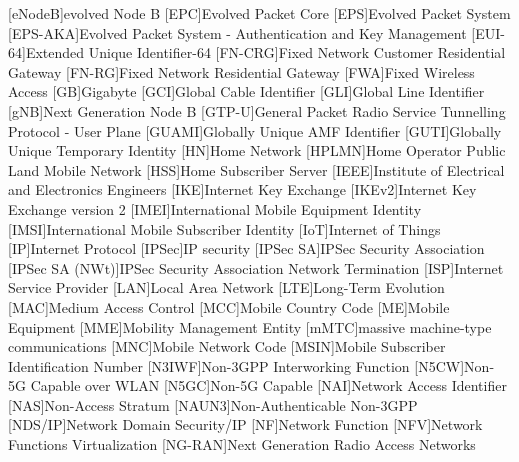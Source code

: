 \begin{multicols}{2}
\begin{acronym}[AAAAAA]
        [eNodeB]{evolved Node B}
        [EPC]{Evolved Packet Core}
        [EPS]{Evolved Packet System}
        [EPS-AKA]{Evolved Packet System - Authentication and Key Management}
        [EUI-64]{Extended Unique Identifier-64}
        [FN-CRG]{Fixed Network Customer Residential Gateway}
        [FN-RG]{Fixed Network Residential Gateway}
        [FWA]{Fixed Wireless Access}
        [GB]{Gigabyte}
        [GCI]{Global Cable Identifier}
        [GLI]{Global Line Identifier}
        [gNB]{Next Generation Node B}
        [GTP-U]{General Packet Radio Service Tunnelling Protocol - User Plane}
        [GUAMI]{Globally Unique AMF Identifier}
        [GUTI]{Globally Unique Temporary Identity}
        [HN]{Home Network}
        [HPLMN]{Home Operator Public Land Mobile Network}
        [HSS]{Home Subscriber Server}
        [IEEE]{Institute of Electrical and Electronics Engineers}
        [IKE]{Internet Key Exchange}
        [IKEv2]{Internet Key Exchange version 2}
        [IMEI]{International Mobile Equipment Identity}
        [IMSI]{International Mobile Subscriber Identity}
        [IoT]{Internet of Things}
        [IP]{Internet Protocol}
        [IPSec]{IP security}
        [IPSec SA]{IPSec Security Association}
        [IPSec SA (NWt)]{IPSec Security Association Network Termination}
        [ISP]{Internet Service Provider}
        [LAN]{Local Area Network}
        [LTE]{Long-Term Evolution}
        [MAC]{Medium Access Control}
        [MCC]{Mobile Country Code}
        [ME]{Mobile Equipment}
        [MME]{Mobility Management Entity}
        [mMTC]{massive machine-type communications}
        [MNC]{Mobile Network Code}
        [MSIN]{Mobile Subscriber Identification Number}
        [N3IWF]{Non-3GPP Interworking Function}
        [N5CW]{Non-5G Capable over WLAN}
        [N5GC]{Non-5G Capable}
        [NAI]{Network Access Identifier}
        [NAS]{Non-Access Stratum}
        [NAUN3]{Non-Authenticable Non-3GPP}
        [NDS/IP]{Network Domain Security/IP}
        [NF]{Network Function}
        [NFV]{Network Functions Virtualization}
        [NG-RAN]{Next Generation Radio Access Networks}

\end{acronym}
\end{multicols}
